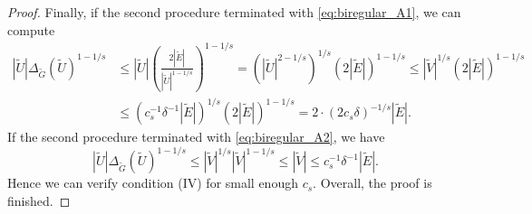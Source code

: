 \documentclass[10pt,a4paper]{amsart}
\begin{document}
\begin{proof}
    Finally, if the second procedure terminated with \eqref{eq:biregular_A1}, we can compute \begin{align*}
        |\tilde{U}|\Delta_{\tilde{G}}(\tilde{U})^{1 - 1/s} &\leq |\tilde{U}|\left( \frac{2|\tilde{E}|}{|\tilde{U}|^{1-1/s}} \right)^{1 - 1/s} = \left( |\tilde{U}|^{2-1/s} \right)^{1/s}\left( 2|\tilde{E}| \right)^{1 - 1/s} \leq |\tilde{V}|^{1/s}\left( 2|\tilde{E}| \right)^{1 - 1/s}\\
        &\leq \left( c_s^{-1}\delta^{-1}|\tilde{E}| \right)^{1/s}\left( 2|\tilde{E}| \right)^{1 - 1/s} = 2 \cdot \left( 2c_s\delta \right)^{-1/s}|\tilde{E}|.
    \end{align*} If the second procedure terminated with \eqref{eq:biregular_A2}, we have \begin{equation*}
         |\tilde{U}|\Delta_{\tilde{G}}(\tilde{U})^{1 - 1/s} \leq |\tilde{V}|^{1/s}|\tilde{V}|^{1-1/s} \leq |\tilde{V}| \leq c_s^{-1}\delta^{-1}|\tilde{E}|.
    \end{equation*} Hence we can verify condition (IV) for small enough $c_s$. Overall, the proof is finished.
\end{proof}
\end{document}
